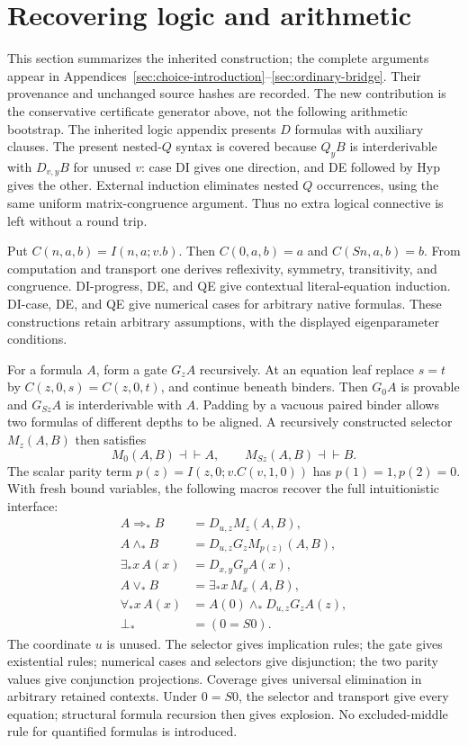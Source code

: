 \documentclass[11pt,letterpaper]{article}
\theoremstyle{definition}\newtheorem{definition}[theorem]{Definition}
\theoremstyle{remark}\newtheorem{remark}[theorem]{Remark}
\begin{document}
\section{Recovering logic and arithmetic}
\label{sec:bridge-summary}

This section summarizes the inherited construction; the complete
arguments appear in Appendices~\ref{sec:choice-introduction}--\ref{sec:ordinary-bridge}.
Their provenance and unchanged source hashes are recorded. The new
contribution is the conservative certificate generator above, not the
following arithmetic bootstrap.
The inherited logic appendix presents $D$ formulas with auxiliary
clauses. The present nested-$Q$ syntax is covered because $Q_yB$ is
interderivable with $D_{v,y}B$ for unused $v$: case DI gives one direction,
and DE followed by Hyp gives the other. External induction eliminates
nested $Q$ occurrences, using the same uniform matrix-congruence
argument. Thus no extra logical connective is left without a round trip.

Put $C(n,a,b)=I(n,a;v.b)$. Then $C(0,a,b)=a$ and $C(Sn,a,b)=b$.
From computation and transport one derives reflexivity, symmetry,
transitivity, and congruence. DI-progress, DE, and QE give contextual
literal-equation induction. DI-case, DE, and QE give numerical cases
for arbitrary native formulas. These constructions retain arbitrary
assumptions, with the displayed eigenparameter conditions.

For a formula $A$, form a gate $G_zA$ recursively. At an equation leaf
replace $s=t$ by $C(z,0,s)=C(z,0,t)$, and continue beneath binders.
Then $G_0A$ is provable and $G_{Sz}A$ is interderivable with $A$.
Padding by a vacuous paired binder allows two formulas of different
depths to be aligned. A recursively constructed selector $M_z(A,B)$
then satisfies
\[
 M_0(A,B)\dashv\vdash A,\qquad M_{Sz}(A,B)\dashv\vdash B.
\]
The scalar parity term $p(z)=I(z,0;v.C(v,1,0))$ has $p(1)=1,p(2)=0$.
With fresh bound variables, the following macros recover the full
intuitionistic interface:
\begin{align*}
 A\Rightarrow_*B&=D_{u,z}M_z(A,B),\\
 A\wedge_*B&=D_{u,z}G_zM_{p(z)}(A,B),\\
 \exists_*x\,A(x)&=D_{x,y}G_yA(x),\\
 A\vee_*B&=\exists_*x\,M_x(A,B),\\
 \forall_*x\,A(x)&=A(0)\wedge_*D_{u,z}G_zA(z),\\
 \bot_*&=(0=S0).
\end{align*}
The coordinate $u$ is unused. The selector gives implication rules;
the gate gives existential rules; numerical cases and selectors give
disjunction; the two parity values give conjunction projections.
Coverage gives universal elimination in arbitrary retained contexts.
Under $0=S0$, the selector and transport give every equation; structural
formula recursion then gives explosion. No excluded-middle rule for
quantified formulas is introduced.
\end{document}
